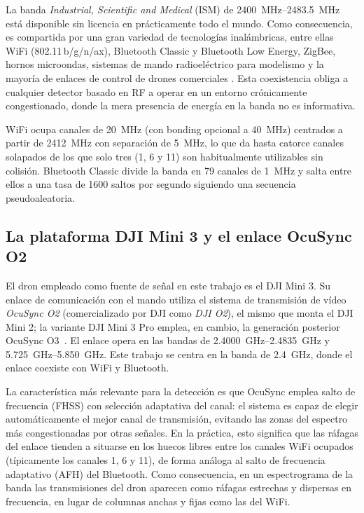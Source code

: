 La banda \emph{Industrial, Scientific and Medical} (ISM) de \SIrange{2400}{2483.5}{\mega\hertz} está disponible sin licencia en prácticamente todo el mundo. Como consecuencia, es compartida por una gran variedad de tecnologías inalámbricas, entre ellas WiFi (802.11\,b/g/n/ax), Bluetooth Classic y Bluetooth Low Energy, ZigBee, hornos microondas, sistemas de mando radioeléctrico para modelismo y la mayoría de enlaces de control de drones comerciales \cite{ieee80211_2020,bluetooth_core_5_4}. Esta coexistencia obliga a cualquier detector basado en RF a operar en un entorno crónicamente congestionado, donde la mera presencia de energía en la banda no es informativa.

WiFi ocupa canales de \SI{20}{\mega\hertz} (con bonding opcional a \SI{40}{\mega\hertz}) centrados a partir de \SI{2412}{\mega\hertz} con separación de \SI{5}{\mega\hertz}, lo que da hasta catorce canales solapados de los que solo tres (1, 6 y 11) son habitualmente utilizables sin colisión. Bluetooth Classic divide la banda en \num{79} canales de \SI{1}{\mega\hertz} y salta entre ellos a una tasa de \num{1600} saltos por segundo siguiendo una secuencia pseudoaleatoria.







\subsection{La plataforma DJI Mini 3 y el enlace OcuSync O2}
\label{sec:plataforma_mini3}

El dron empleado como fuente de señal en este trabajo es el DJI Mini 3. Su enlace de comunicación con el mando utiliza el sistema de transmisión de vídeo \emph{OcuSync O2} (comercializado por DJI como \emph{DJI O2}), el mismo que monta el DJI Mini 2; la variante DJI Mini 3 Pro emplea, en cambio, la generación posterior OcuSync O3~\cite{dji_mini3_manual,heliguy_dji_transmission}. El enlace opera en las bandas de \SIrange{2.4000}{2.4835}{\giga\hertz} y \SIrange{5.725}{5.850}{\giga\hertz}. Este trabajo se centra en la banda de \SI{2.4}{\giga\hertz}, donde el enlace coexiste con WiFi y Bluetooth.

La característica más relevante para la detección es que OcuSync emplea salto de frecuencia (FHSS) con selección adaptativa del canal: el sistema es capaz de elegir automáticamente el mejor canal de transmisión, evitando las zonas del espectro más congestionadas por otras señales. En la práctica, esto significa que las ráfagas del enlace tienden a situarse en los huecos libres entre los canales WiFi ocupados (típicamente los canales 1, 6 y 11), de forma análoga al salto de frecuencia adaptativo (AFH) del Bluetooth. Como consecuencia, en un espectrograma de la banda las transmisiones del dron aparecen como ráfagas estrechas y dispersas en frecuencia, en lugar de columnas anchas y fijas como las del WiFi.

